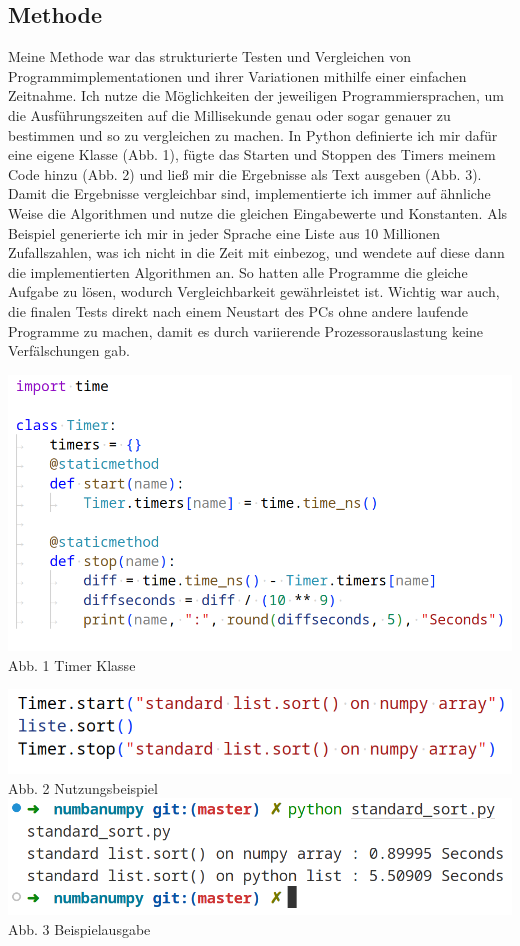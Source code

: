 \documentclass[11pt,a4paper]{article}
\begin{document}
\subsection{Methode}

Meine Methode war das strukturierte Testen und Vergleichen von Programmimplementationen und ihrer 
Variationen mithilfe einer einfachen Zeitnahme. Ich nutze die Möglichkeiten der jeweiligen Programmiersprachen, 
um die Ausführungszeiten auf die Millisekunde genau oder sogar genauer zu bestimmen und 
so zu vergleichen zu machen. In Python definierte ich mir dafür eine eigene Klasse (Abb. 1), fügte das Starten und Stoppen
des Timers meinem Code hinzu (Abb. 2) und ließ mir die Ergebnisse als Text ausgeben (Abb. 3).
Damit die Ergebnisse vergleichbar sind, implementierte ich immer auf ähnliche Weise die Algorithmen und
nutze die gleichen Eingabewerte und Konstanten.
Als Beispiel generierte ich mir in jeder Sprache eine Liste aus 10 Millionen Zufallszahlen,
was ich nicht in die Zeit mit einbezog, und wendete auf diese dann die implementierten Algorithmen an.
So hatten alle Programme die gleiche Aufgabe zu lösen, wodurch Vergleichbarkeit gewährleistet ist.
Wichtig war auch, die finalen Tests direkt nach einem Neustart des PCs ohne andere laufende Programme
zu machen, damit es durch variierende Prozessorauslastung keine Verfälschungen gab. 

\begin{multicols}{2}
    
    \begin{center}
        \includegraphics[width=.5\textwidth]{screenshots/pythontimerlight.png}
        Abb. 1 Timer Klasse
    \end{center}
    
    \columnbreak
    
    \begin{center}
        \includegraphics[width=.5\textwidth]{screenshots/timerexamplelight.png}
        Abb. 2 Nutzungsbeispiel
        \includegraphics[width=.5\textwidth]{screenshots/outputexamplelight.png}
        Abb. 3 Beispielausgabe
    \end{center}
    
\end{multicols}
\end{document}
